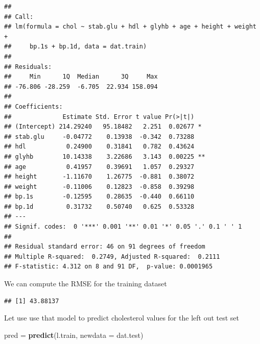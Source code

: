 \documentclass[
]{book}
\newenvironment{Shaded}{\begin{snugshade}}{\end{snugshade}}
\newcommand{\AttributeTok}[1]{\textcolor[rgb]{0.13,0.29,0.53}{#1}}
\newcommand{\DecValTok}[1]{\textcolor[rgb]{0.00,0.00,0.81}{#1}}
\newcommand{\FunctionTok}[1]{\textcolor[rgb]{0.13,0.29,0.53}{\textbf{#1}}}
\newcommand{\NormalTok}[1]{#1}
\newcommand{\OtherTok}[1]{\textcolor[rgb]{0.56,0.35,0.01}{#1}}
\newcommand{\SpecialCharTok}[1]{\textcolor[rgb]{0.81,0.36,0.00}{\textbf{#1}}}
\begin{document}
\begin{verbatim}
## 
## Call:
## lm(formula = chol ~ stab.glu + hdl + glyhb + age + height + weight + 
##     bp.1s + bp.1d, data = dat.train)
## 
## Residuals:
##     Min      1Q  Median      3Q     Max 
## -76.806 -28.259  -6.705  22.934 158.094 
## 
## Coefficients:
##              Estimate Std. Error t value Pr(>|t|)   
## (Intercept) 214.29240   95.18482   2.251  0.02677 * 
## stab.glu     -0.04772    0.13938  -0.342  0.73288   
## hdl           0.24900    0.31841   0.782  0.43624   
## glyhb        10.14338    3.22686   3.143  0.00225 **
## age           0.41957    0.39691   1.057  0.29327   
## height       -1.11670    1.26775  -0.881  0.38072   
## weight       -0.11006    0.12823  -0.858  0.39298   
## bp.1s        -0.12595    0.28635  -0.440  0.66110   
## bp.1d         0.31732    0.50740   0.625  0.53328   
## ---
## Signif. codes:  0 '***' 0.001 '**' 0.01 '*' 0.05 '.' 0.1 ' ' 1
## 
## Residual standard error: 46 on 91 degrees of freedom
## Multiple R-squared:  0.2749, Adjusted R-squared:  0.2111 
## F-statistic: 4.312 on 8 and 91 DF,  p-value: 0.0001965
\end{verbatim}

We can compute the RMSE for the training dataset

\begin{Shaded}
\end{Shaded}

\begin{verbatim}
## [1] 43.88137
\end{verbatim}

Let use use that model to predict cholesterol values for the left out test set

\begin{Shaded}
\begin{Highlighting}[]
\NormalTok{pred }\OtherTok{=} \FunctionTok{predict}\NormalTok{(l.train, }\AttributeTok{newdata =}\NormalTok{ dat.test)}
\end{Highlighting}
\end{Shaded}
\end{document}

